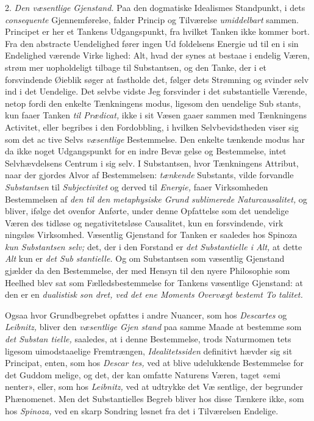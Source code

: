 2. \emph{Den væsentlige Gjenstand.} Paa den dogmatiske
Idealismes Standpunkt, i dets \emph{consequente} Gjennemførelse,
falder Princip og Tilværelse \emph{umiddelbart} sammen. Principet
er her et Tankens Udgangspunkt, fra hvilket Tanken ikke
kommer bort. Fra den abstracte Uendelighed fører ingen Ud\-%
foldelsens Energie ud til en i sin Endelighed værende Virke\-%
lighed: Alt, hvad der synes at bestaae i endelig Væren, strøm\-%
mer uopholdeligt tilbage til Substantsen, og den Tanke, der i
et forsvindende Øieblik søger at fastholde det, følger dets
Strømning og svinder selv ind i det Uendelige. Det selvbe\-%
vidste Jeg forsvinder i det substantielle Værende, netop fordi
den enkelte Tænkningens modus, ligesom den uendelige Sub\-%
stants, kun faaer Tanken \emph{til Prædicat,} ikke i sit Væsen
gaaer sammen med Tænkningens Activitet, eller begribes i den
Fordobbling, i hvilken Selvbevidstheden viser sig som det ac\-%
tive Selvs \emph{væsentlige} Bestemmelse. Den enkelte tænkende
modus har da ikke noget Udgangspunkt for en indre Bevæ\-%
gelse og Bestemmelse, intet Selvhævdelsens Centrum i sig selv.
I Substantsen, hvor Tænkningens Attribut, naar der gjordes
Alvor af Bestemmelsen: \emph{tænkende} Substants, vilde forvandle
\emph{Substantsen} til \emph{Subjectivitet} og derved til \emph{Energie,} faaer
Virksomheden Bestemmelsen af \emph{den til den metaphysiske
Grund sublimerede Naturcausalitet,} og bliver, ifølge det
ovenfor Anførte, under denne Opfattelse som det uendelige Væren\-%
des tidløse og negativitetsløse Causalitet, kun en forsvindende, virk\-%
ningsløs Virksomhed. Væsentlig Gjenstand for Tanken er saaledes
hos Spinoza \emph{kun Substantsen selv;} det, der i den Forstand er
\emph{det Substantielle i Alt,} at dette \emph{Alt} kun er \emph{det Sub\-%
stantielle.} Og om Substantsen som væsentlig Gjenstand
gjælder da den Bestemmelse, der med Hensyn til den nyere
Philosophie som Heelhed blev sat som Fælledsbestemmelse for
Tankens væsentlige Gjenstand: at den er en \emph{dualistisk son\-%
dret, ved det ene Moments Overvægt bestemt To\-%
talitet.}

Ogsaa hvor Grundbegrebet opfattes i andre Nuancer, som
hos \emph{Descartes} og \emph{Leibnitz,} bliver den \emph{væsentlige Gjen\-%
stand} paa samme Maade at bestemme som \emph{det Substan\-%
tielle,} saaledes, at i denne Bestemmelse, trods Naturmomen\-%
tets ligesom uimodstaaelige Fremtrængen, \emph{Idealitetssiden}
definitivt hævder sig sit Principat, enten, som hos \emph{Descar\-%
tes,} ved at blive udelukkende Bestemmelse for det Guddom\-%
melige, og det, der kan omfatte Naturens Væren, taget «emi\-%
nenter», eller, som hos \emph{Leibnitz,} ved at udtrykke det Væ\-%
sentlige, der begrunder Phænomenet. Men det Substantielles
Begreb bliver hos disse Tænkere ikke, som hos \emph{Spinoza,} ved
en skarp Sondring løsnet fra det i Tilværelsen Endelige.

